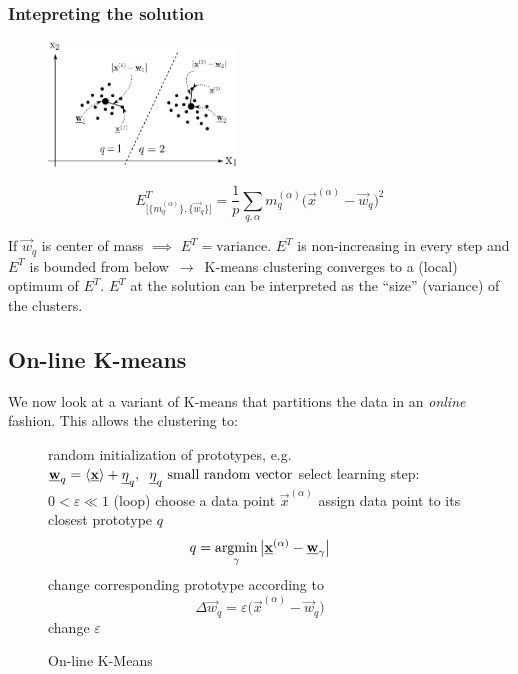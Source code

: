 \begin{frame} \frametitle{Intepreting the solution}
\begin{figure}[h]
\includegraphics[width=5.0cm]{img/section4_fig2_withincluster}
\end{figure}
$$
	E_{ \big[ \big\{ m_q^{(\alpha)} \big\}, \big\{ \vec{w}_q \big\} 
		\big] }^T = \frac{1}{p} \sum\limits_{q,\alpha} m_q^{(\alpha)}
		\big( \vec{x}^{(\alpha)} - \vec{w}_q \big)^2
$$
\begin{itemize}
 \itR If $\vec{w}_q$ is center of mass $\implies$ $E^T = \mathrm{variance}$.
 \itR $E^T$ is non-increasing in every step and $E^T$ is bounded from below $\,\to\,$ K-means clustering converges to a (local) optimum of $E^T$. 
\itR $E^T$ at the solution can be interpreted as the ``size'' (variance) of the clusters.
\end{itemize} 
\end{frame}

\begin{frame}
\section{On-line K-means}

We now look at a variant of K-means that partitions the data in an \emph{online} fashion. This allows the clustering to:

\begin{figure}[!th]
\footnotesize
\removelatexerror
\begin{algorithm}[H]
  \DontPrintSemicolon
   random initialization of prototypes, e.g.\ $\vec{w}_{q} = \langle  \vec{x} \rangle +\vec{\eta}_{q},\hspace{0.2cm} \vec{\eta}_{q}  \text{ small random vector}$\;
  select learning step:   $0 < \varepsilon  \ll 1$\;
  \Begin(loop){
    choose a data point $\vec{x}^{(\alpha)}$ \;
    assign data point to its closest prototype $q$\;
    \[ q = \argmin_{\gamma} \big| \vec{x}^{(\alpha)} - \vec{w}_{\gamma} \big| \]
    change corresponding prototype according to\;
    \[ \Delta \vec{w}_q = \varepsilon \big( \vec{x}^{(\alpha)} - \vec{w}_{q} \big) \]
    change $\varepsilon$ \;
  }
  \label{alg:on-line-k-means}
  \caption{On-line K-Means}
\end{algorithm}
\end{figure}

\end{frame}

